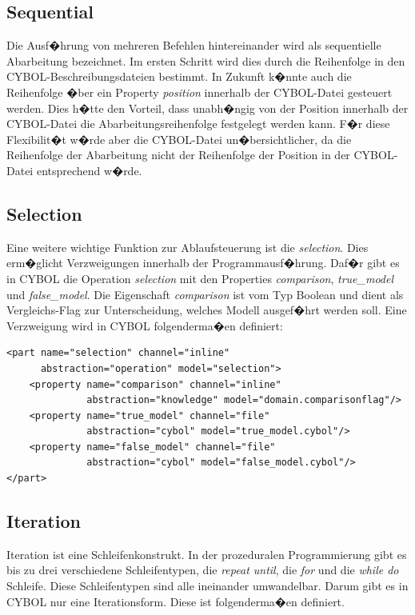     \subsection{Sequential}
      
      Die Ausf�hrung von mehreren Befehlen hintereinander wird 
      als sequentielle Abarbeitung bezeichnet. Im ersten Schritt 
      wird dies durch die 
      Reihenfolge in den CYBOL-Beschreibungsdateien bestimmt.
      In Zukunft k�nnte auch die Reihenfolge �ber ein Property \emph{position}
      innerhalb der CYBOL-Datei gesteuert werden. 
      Dies h�tte den Vorteil, dass unabh�ngig von der Position innerhalb 
      der CYBOL-Datei die Abarbeitungsreihenfolge festgelegt werden kann. F�r
      diese Flexibilit�t w�rde aber die CYBOL-Datei un�bersichtlicher,
      da die Reihenfolge der Abarbeitung nicht der Reihenfolge der 
      Position in der CYBOL-Datei entsprechend w�rde.

    \subsection{Selection}
    
      Eine weitere wichtige Funktion zur Ablaufsteuerung ist die \emph{selection}. Dies 
      erm�glicht Verzweigungen innerhalb der Programmausf�hrung. Daf�r gibt es in CYBOL
      die Operation \emph{selection} mit den Properties \emph{comparison}, 
      \emph{true\_model} und \emph{false\_model}. Die Eigenschaft \emph{comparison} 
      ist vom Typ Boolean und dient als Vergleichs-Flag zur Unterscheidung, welches Modell 
      ausgef�hrt werden soll. Eine Verzweigung wird in CYBOL folgenderma�en definiert:
\begin{verbatim}      
<part name="selection" channel="inline" 
      abstraction="operation" model="selection">
    <property name="comparison" channel="inline" 
              abstraction="knowledge" model="domain.comparisonflag"/>
    <property name="true_model" channel="file" 
              abstraction="cybol" model="true_model.cybol"/>
    <property name="false_model" channel="file" 
              abstraction="cybol" model="false_model.cybol"/>
</part>
\end{verbatim}      
    

    \subsection{Iteration}
    
      Iteration ist eine Schleifenkonstrukt. In der prozeduralen  
      Programmierung gibt es bis zu drei verschiedene Schleifentypen, die \emph{repeat until},
      die \emph{for} und die \emph{while do} Schleife. Diese Schleifentypen sind alle 
      ineinander umwandelbar. Darum gibt es in CYBOL nur eine Iterationsform. 
      Diese ist folgenderma�en definiert.
      
